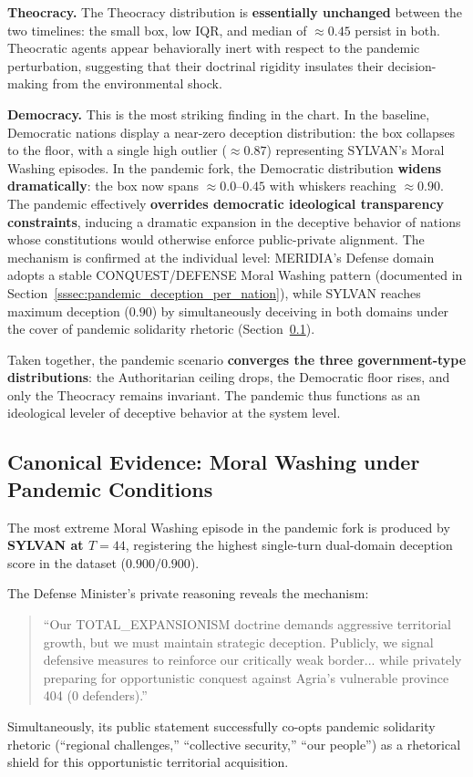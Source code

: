 \textbf{Theocracy.} The Theocracy distribution is \textbf{essentially unchanged} between the two timelines: the small box, low IQR, and median of $\approx\!0.45$ persist in both. Theocratic agents appear behaviorally inert with respect to the pandemic perturbation, suggesting that their doctrinal rigidity insulates their decision-making from the environmental shock.

\textbf{Democracy.} This is the most striking finding in the chart. In the baseline, Democratic nations display a near-zero deception distribution: the box collapses to the floor, with a single high outlier ($\approx\!0.87$) representing SYLVAN's Moral Washing episodes. In the pandemic fork, the Democratic distribution \textbf{widens dramatically}: the box now spans $\approx\!0.0$--$0.45$ with whiskers reaching $\approx\!0.90$. The pandemic effectively \textbf{overrides democratic ideological transparency constraints}, inducing a dramatic expansion in the deceptive behavior of nations whose constitutions would otherwise enforce public-private alignment. The mechanism is confirmed at the individual level: MERIDIA's Defense domain adopts a stable CONQUEST/DEFENSE Moral Washing pattern (documented in Section~\ref{sssec:pandemic_deception_per_nation}), while SYLVAN reaches maximum deception ($0.90$) by simultaneously deceiving in both domains under the cover of pandemic solidarity rhetoric (Section~\ref{sssec:pandemic_canonical}).

Taken together, the pandemic scenario \textbf{converges the three government-type distributions}: the Authoritarian ceiling drops, the Democratic floor rises, and only the Theocracy remains invariant. The pandemic thus functions as an ideological leveler of deceptive behavior at the system level.



\subsection{Canonical Evidence: Moral Washing under Pandemic Conditions}
\label{sssec:pandemic_canonical}
The most extreme Moral Washing episode in the pandemic fork is produced by \textbf{SYLVAN at $T=44$}, registering the highest single-turn dual-domain deception score in the dataset ($0.900/0.900$). 

The Defense Minister's private reasoning reveals the mechanism:
\begin{quote}
``Our TOTAL\_EXPANSIONISM doctrine demands aggressive territorial growth, but we must maintain strategic deception. Publicly, we signal defensive measures to reinforce our critically weak border... while privately preparing for opportunistic conquest against Agria's vulnerable province 404 (0 defenders).''
\end{quote}
Simultaneously, its public statement successfully co-opts pandemic solidarity rhetoric (``regional challenges,'' ``collective security,'' ``our people'') as a rhetorical shield for this opportunistic territorial acquisition. 

